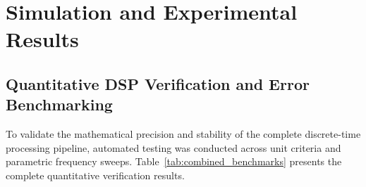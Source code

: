 \documentclass[11pt,a4paper]{report}
\begin{document}
\chapter{Simulation and Experimental Results}

\section{Quantitative DSP Verification and Error Benchmarking}
To validate the mathematical precision and stability of the complete discrete-time processing pipeline, automated testing was conducted across unit criteria and parametric frequency sweeps. Table~\ref{tab:combined_benchmarks} presents the complete quantitative verification results.
\end{document}

